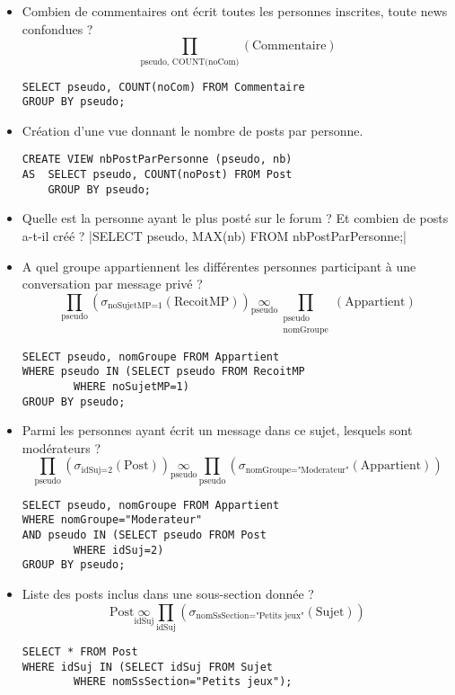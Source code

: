 \begin{itemize}
	\item Combien de commentaires ont écrit toutes les personnes inscrites, toute news confondues ?
	\[\prod_{\text{pseudo, COUNT(noCom)}}\left(\text{Commentaire}\right)\]
	\begin{verbatim}
SELECT pseudo, COUNT(noCom) FROM Commentaire
GROUP BY pseudo;
	\end{verbatim}

	\item Création d'une vue donnant le nombre de posts par personne.
\begin{verbatim}
CREATE VIEW nbPostParPersonne (pseudo, nb)
AS	SELECT pseudo, COUNT(noPost) FROM Post
	GROUP BY pseudo;
\end{verbatim}

	\item Quelle est la personne ayant le plus posté sur le forum ? Et combien de posts a-t-il créé ?
|SELECT pseudo, MAX(nb) FROM nbPostParPersonne;|

	\item A quel groupe appartiennent les différentes personnes participant à une conversation par message privé ?
	\[\prod_{\text{pseudo}}\left( \sigma_{\text{noSujetMP=1}}(\text{RecoitMP})\right)\underset{\text{pseudo}}{\infty}\prod_{\begin{array}{c} \text{pseudo}\\\text{nomGroupe}\end{array}}(\text{Appartient})\]
	\begin{verbatim}
SELECT pseudo, nomGroupe FROM Appartient
WHERE pseudo IN (SELECT pseudo FROM RecoitMP
		WHERE noSujetMP=1)
GROUP BY pseudo;
	\end{verbatim}

	\item Parmi les personnes ayant écrit un message dans ce sujet, lesquels sont modérateurs ?
	\[\prod_{\text{pseudo}}\left(\sigma_{\text{idSuj=2}}(\text{Post})\right)\underset{\text{pseudo}}{\infty} \prod_{\text{pseudo}}\left( \sigma_{\text{nomGroupe="Moderateur"}}(\text{Appartient})\right)\]
	\begin{verbatim}
SELECT pseudo, nomGroupe FROM Appartient
WHERE nomGroupe="Moderateur"
AND pseudo IN (SELECT pseudo FROM Post
		WHERE idSuj=2)
GROUP BY pseudo;
	\end{verbatim}

	\item Liste des posts inclus dans une sous-section donnée ?
	\[\text{Post}\underset{\text{idSuj}}{\infty}\prod_{\text{idSuj}}\left(\sigma_{\text{nomSsSection="Petits jeux"}}(\text{Sujet})\right)\]
	\begin{verbatim}
SELECT * FROM Post
WHERE idSuj IN (SELECT idSuj FROM Sujet
		WHERE nomSsSection="Petits jeux");
	\end{verbatim}
\end{itemize}
